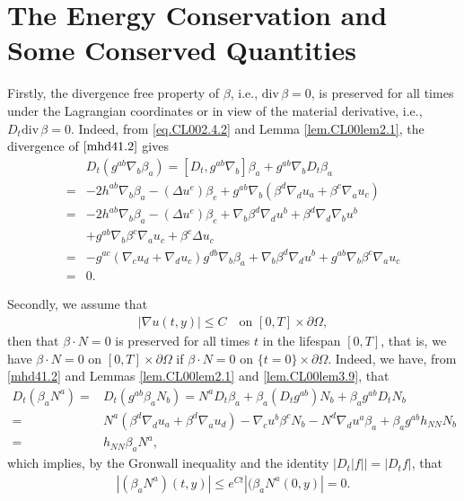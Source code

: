 \documentclass[12pt,reqno]{amsart}
\numberwithin{equation}{section}
\theoremstyle{definition}
\theoremstyle{remark}
\begin{document}
\section{The Energy Conservation and Some Conserved Quantities}

Firstly, the divergence free property of $\beta$, i.e., ${\mathrm{div}\,}\beta=0$, is preserved for all times under the Lagrangian coordinates or in view of the material derivative, i.e., $D_t{\mathrm{div}\,}\beta=0$. Indeed, from \eqref{eq.CL002.4.2} and Lemma \ref{lem.CL00lem2.1}, the divergence of $\eqref{mhd41.2}$ gives
  \begin{align*}
    &D_t(g^{ab}{\nabla}_b\beta_a)=[D_t,g^{ab}{\nabla}_b]\beta_a+g^{ab}{\nabla}_b D_t \beta_a\\
    =&-2h^{ab}{\nabla}_b\beta_a-(\Delta u^e) \beta_e+g^{ab}{\nabla}_b(\beta^d{\nabla}_d u_a+\beta^c{\nabla}_a u_c)\\
    =&-2h^{ab}{\nabla}_b\beta_a-(\Delta u^e) \beta_e+{\nabla}_b\beta^d {\nabla}_d u^b+\beta^d{\nabla}_d{\nabla}_b u^b\\
    &+g^{ab}{\nabla}_b \beta^c {\nabla}_a u_c+\beta^c\Delta u_c\\
    =&-g^{ac}({\nabla}_c u_d+{\nabla}_d u_c)g^{db}{\nabla}_b\beta_a+{\nabla}_b\beta^d {\nabla}_d u^b+g^{ab}{\nabla}_b \beta^c {\nabla}_a u_c\\
    =&0.
  \end{align*}

Secondly, we assume that
\begin{align}\label{eq.beta0}
     |{\nabla} u(t,y)|{\leqslant} C\quad  \text{on } [0,T]\times{\partial}\Omega,
\end{align}
then that $\beta\cdot N=0$ is preserved for all times $t$ in the lifespan $[0,T]$, that is, we have $\beta\cdot N=0$ on $[0,T]\times{\partial}\Omega$ if $\beta\cdot N=0$ on $\{t=0\}\times{\partial}\Omega$. Indeed, we have, from \eqref{mhd41.2} and Lemmas \ref{lem.CL00lem2.1} and \ref{lem.CL00lem3.9}, that
\begin{align*}
  D_t(\beta_aN^a)=&D_t(g^{ab}\beta_a N_b)=N^aD_t\beta_a+\beta_a (D_tg^{ab})N_b+\beta_ag^{ab}D_tN_b\\
  =&N^a(\beta^d{\nabla}_du_a+\beta^d{\nabla}_a u_d)-{\nabla}_cu^b\beta^cN_b-N^d{\nabla}_du^a\beta_a+\beta_ag^{ab}h_{NN}N_b\\
  =&h_{NN}\beta_aN^a,
\end{align*}
which implies, by the Gronwall inequality and  the identity $\big|D_t|f|\big|={\left\vert{D_t f}\right\vert}$, that
\begin{align}
  |(\beta_aN^a)(t,y)|{\leqslant} e^{Ct} |(\beta_aN^a(0,y)|=0.
\end{align}
\end{document}

